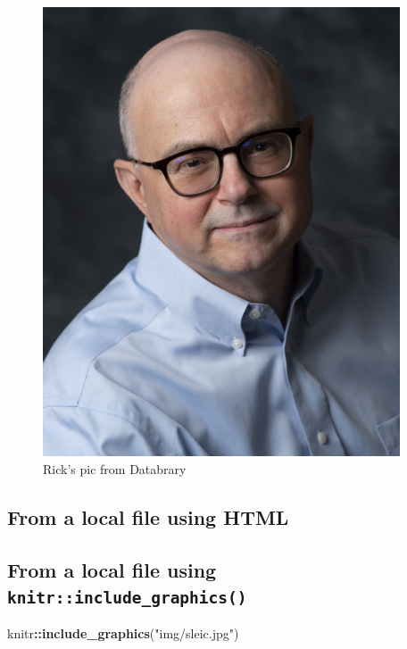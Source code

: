 \documentclass[]{article}
\newenvironment{Shaded}{\begin{snugshade}}{\end{snugshade}}
\newcommand{\KeywordTok}[1]{\textcolor[rgb]{0.13,0.29,0.53}{\textbf{#1}}}
\newcommand{\NormalTok}[1]{#1}
\newcommand{\OperatorTok}[1]{\textcolor[rgb]{0.81,0.36,0.00}{\textbf{#1}}}
\newcommand{\StringTok}[1]{\textcolor[rgb]{0.31,0.60,0.02}{#1}}
\begin{document}
\begin{figure}

{\centering \includegraphics[width=400px]{img/rog} 

}

\caption{Rick's pic from Databrary}\label{fig:rog}
\end{figure}

\hypertarget{from-a-local-file-using-html}{%
\subsection{From a local file using
HTML}\label{from-a-local-file-using-html}}

\hypertarget{from-a-local-file-using-knitrinclude_graphics}{%
\subsection{\texorpdfstring{From a local file using
\texttt{knitr::include\_graphics()}}{From a local file using knitr::include\_graphics()}}\label{from-a-local-file-using-knitrinclude_graphics}}

\begin{Shaded}
\begin{Highlighting}[]
\NormalTok{knitr}\OperatorTok{::}\KeywordTok{include_graphics}\NormalTok{(}\StringTok{"img/sleic.jpg"}\NormalTok{)}
\end{Highlighting}
\end{Shaded}
\end{document}
